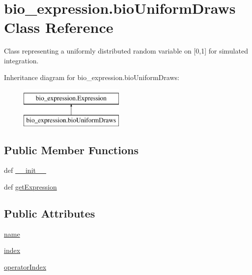 \hypertarget{classbio__expression_1_1bio_uniform_draws}{\section{bio\+\_\+expression.\+bio\+Uniform\+Draws Class Reference}
\label{classbio__expression_1_1bio_uniform_draws}
}


Class representing a uniformly distributed random variable on \mbox{[}0,1\mbox{]} for simulated integration.  


Inheritance diagram for bio\+\_\+expression.\+bio\+Uniform\+Draws\+:\begin{figure}[H]
\begin{center}
\leavevmode
\includegraphics[height=2.000000cm]{df/dd8/classbio__expression_1_1bio_uniform_draws}
\end{center}
\end{figure}
\subsection*{Public Member Functions}
\begin{DoxyCompactItemize}
\item 
def \hyperlink{classbio__expression_1_1bio_uniform_draws_aad44943de1683c71b8fe596178b30550}{\+\_\+\+\_\+init\+\_\+\+\_\+}
\item 
def \hyperlink{classbio__expression_1_1bio_uniform_draws_a005fefa2fe7bc6e09918c35850701980}{get\+Expression}
\end{DoxyCompactItemize}
\subsection*{Public Attributes}
\begin{DoxyCompactItemize}
\item 
\hyperlink{classbio__expression_1_1bio_uniform_draws_aeefe9e06713e94d4452737ffaae08b6b}{name}
\item 
\hyperlink{classbio__expression_1_1bio_uniform_draws_abd25acf45bf3ce1538f5b9db2c8846cf}{index}
\item 
\hyperlink{classbio__expression_1_1bio_uniform_draws_ac4174426e493fe9f054e548d8093c841}{operator\+Index}
\end{DoxyCompactItemize}


